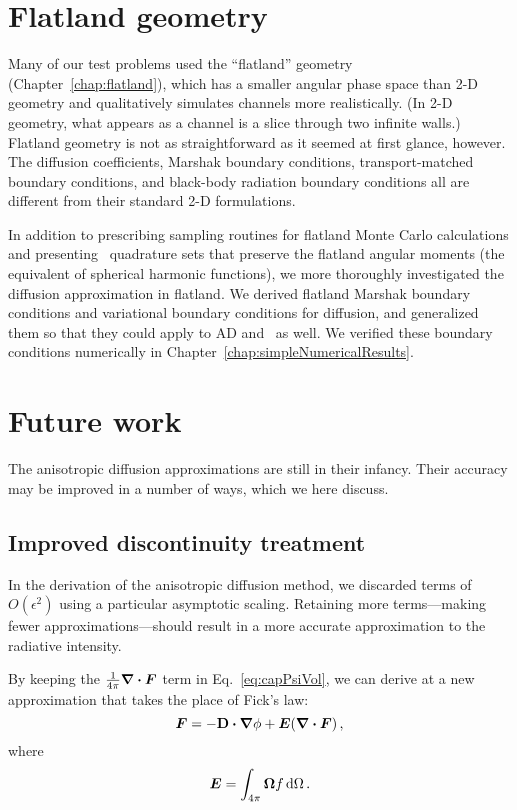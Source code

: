 \section{Flatland geometry}

Many of our test problems used the ``flatland'' geometry
(Chapter~\ref{chap:flatland}), which has a smaller angular phase space than 2-D
geometry and qualitatively simulates channels more realistically. (In 2-D
geometry, what appears as a channel is a slice through two infinite walls.)
Flatland geometry is not as straightforward as it seemed at first glance,
however. The diffusion coefficients, Marshak boundary conditions,
transport-matched boundary conditions, and black-body radiation boundary
conditions all are different from their standard 2-D formulations.

In addition to prescribing sampling routines for flatland Monte Carlo
calculations and presenting \SN\ quadrature sets that preserve the flatland
angular moments (the equivalent of spherical harmonic functions), we more
thoroughly investigated the diffusion approximation in flatland. We derived
flatland Marshak boundary conditions and variational boundary conditions for
diffusion, and generalized them so that they could apply to AD and \APone\ as
well. We verified these boundary conditions numerically in
Chapter~\ref{chap:simpleNumericalResults}.

\section{Future work}

The anisotropic diffusion approximations are still in their infancy. Their
accuracy may be improved in a number of ways, which we here discuss.

\subsection{Improved discontinuity treatment}

In the derivation of the anisotropic diffusion method, we discarded
terms of $O(\epsilon^2)$ using a particular asymptotic scaling. Retaining more
terms---making fewer approximations---should result in a more accurate
approximation to the radiative intensity.

By keeping the $\frac{1}{4\pi} \bm{\nabla} \bm{\cdot} \bm{F}$ term in
Eq.~\eqref{eq:capPsiVol}, we can derive at a new approximation that takes the place
of Fick's law:
\begin{equation*}
  \bm{F} = - \mathbf{D} \bm{\cdot} \bm{\nabla} \phi + \bm{E} (\bm{\nabla} \bm{\cdot}\bm{F})\,,
\end{equation*}
where
\begin{equation*}
  \bm{E} = \int_{4\pi} \bm{\Omega} f \mathop{}\!\mathrm{d}\Omega\,.
\end{equation*}

